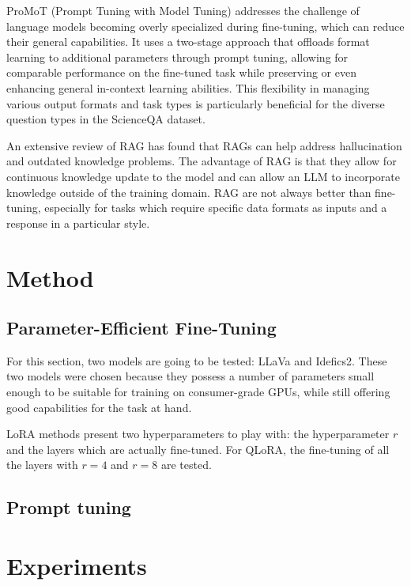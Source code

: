 \documentclass{article}
\begin{document}
ProMoT (Prompt Tuning with Model Tuning) \cite{valizadehaslani2022twostagefinetuningnovelstrategy} addresses the challenge of language models becoming overly specialized during fine-tuning, which can reduce their general capabilities. It uses a two-stage approach that offloads format learning to additional parameters through prompt tuning, allowing for comparable performance on the fine-tuned task while preserving or even enhancing general in-context learning abilities. This flexibility in managing various output formats and task types is particularly beneficial for the diverse question types in the ScienceQA dataset.

An extensive review of RAG \cite{ragreview} has found that RAGs can help address hallucination and outdated knowledge problems. The advantage of RAG is that they allow for continuous knowledge update to the model and can allow an LLM to incorporate knowledge outside of the training domain. RAG are not always better than fine-tuning, especially for tasks which require specific data formats as inputs and a response in a particular style.



\section{Method}
\label{sec:method}

\subsection{Parameter-Efficient Fine-Tuning}
For this section, two models are going to be tested: LLaVa\cite{liu2023llava} and Idefics2\cite{idefics2}. These
two models were chosen because they possess a number of parameters small enough to be suitable for training
on consumer-grade GPUs, while still offering good capabilities for the task at hand.

LoRA methods present two hyperparameters to play with: the hyperparameter $r$ and the layers which are actually
fine-tuned. For QLoRA, the fine-tuning of all the layers with $r=4$ and $r=8$ are tested.

\subsection{Prompt tuning}

\section{Experiments}
\label{sec:experiments}
\end{document}
